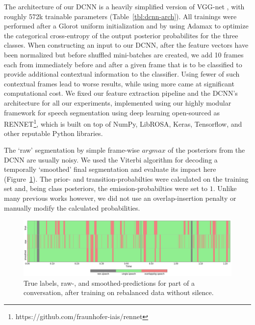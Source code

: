 \documentclass[a4paper]{article}
\begin{document}
The architecture of our DCNN is a heavily simplified version of VGG-net \cite{simonyan_very_2014},
with roughly 572k trainable parameters (Table~\ref{tbl:dcnn-arch}).
All trainings were performed after a Glorot uniform initialization and by using Adamax to optimize the categorical cross-entropy of the output posterior probabilites for the three classes.
When constructing an input to our DCNN,
after the feature vectors have been normalized but before shuffled mini-batches are created,
we add 10 frames each from immediately before and after a given frame that is to be classified
to provide additional contextual information to the classifier.
Using fewer of such contextual frames lead to worse results,
while using more came at significant computational cost.
We fixed our feature extraction pipeline and the DCNN's architecture for all our experiments,
implemented using our highly modular framework for
speech segmentation using deep learning open-sourced as
{RENNET}\footnote{https://github.com/fraunhofer-iais/rennet},
which is built on top of NumPy, LibROSA, Keras, Tensorflow, and other reputable Python libraries.

The `raw' segmentation by simple frame-wise $argmax$ of the posteriors from the DCNN are usually noisy.
We used the Viterbi algorithm \cite{rabiner_tutorial_1989} for decoding a temporally `smoothed' final segmentation and evaluate its impact here (Figure~\ref{fig:raw-smth-preds}).
The prior- and transition-probabilties were calculated on the training set and,
being class posteriors, the emission-probabilties were set to $1$.
Unlike many previous works \cite{zelenak_simultaneous_2012,zelenak_speaker_2012,GeigerUsinglinguisticinformation2013,yella_overlapping_2014,geiger_detecting_2013} however,
we did not use an overlap-insertion penalty or manually modify the calculated probabilities.

\begin{figure}[t]
  \centering
  \includegraphics[width=\linewidth]{figures/raw-smth-preds.png}
  \caption{True labels, raw-, and smoothed-predictions for part of a conversation, after training on rebalanced data without silence.}
  \label{fig:raw-smth-preds}
  \vspace*{-\baselineskip}
\end{figure}
\end{document}
